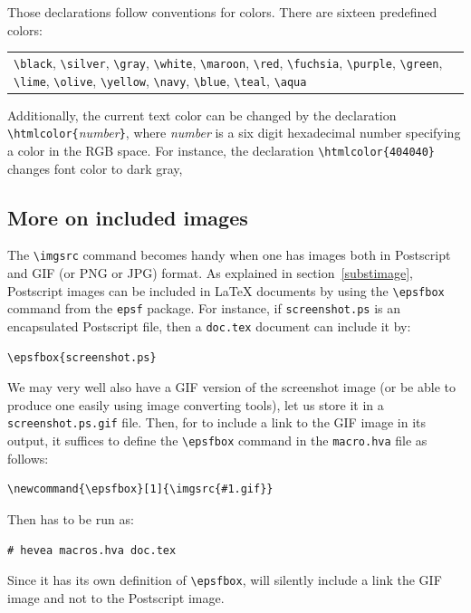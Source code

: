 Those declarations follow \html{} conventions for colors.
There are sixteen predefined colors:
\begin{center}
\begin{tabular}{p{.7\linewidth}}
\verb+\black+,
\verb+\silver+,
\verb+\gray+,
\verb+\white+,
\verb+\maroon+,
\verb+\red+,
\verb+\fuchsia+,
\verb+\purple+,
\verb+\green+,
\verb+\lime+,
\verb+\olive+,
\verb+\yellow+,
\verb+\navy+,
\verb+\blue+,
\verb+\teal+,
\verb+\aqua+
\end{tabular}
\end{center}
Additionally, the current text color can be
changed by the declaration \verb+\htmlcolor{+{\it number}\verb+}+,
where {\it number} is a six digit hexadecimal number specifying a
color in the RGB space.  For instance, the declaration
\verb+\htmlcolor{404040}+
changes font color to dark gray,

\subsection{More on included\label{imgsrc} images}
The \verb+\imgsrc+ command becomes handy when one has images both in
Postscript and GIF (or PNG or JPG) format.  As explained in
section~\ref{substimage}, Postscript images can be included in
\LaTeX{} documents by using the \verb+\epsfbox+ command from the
\texttt{epsf} package.  For instance, if \texttt{screenshot.ps} is an
encapsulated Postscript file, then a \texttt{doc.tex} document can
include it by:
\begin{verbatim}
\epsfbox{screenshot.ps}
\end{verbatim}
We may very well also have a GIF version of the screenshot image
(or be able to produce one easily using image converting tools),
let us store it in a \texttt{screenshot.ps.gif} file.
Then, for \hevea{} to include a link to the GIF image in its
output, it suffices
to define the \verb+\epsfbox+ command in the \texttt{macro.hva} file
as follows:
\begin{verbatim}
\newcommand{\epsfbox}[1]{\imgsrc{#1.gif}}
\end{verbatim}
Then \hevea{} has to be run as:
\begin{verbatim}
# hevea macros.hva doc.tex
\end{verbatim}
Since it has its own definition of \verb+\epsfbox+, \hevea{} will
silently include a link the GIF image and not to the Postscript image.

